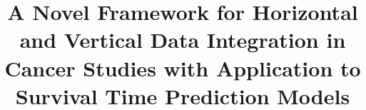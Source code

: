 \documentclass{bmcart}
\begin{document}
\begin{frontmatter}

\begin{fmbox}


\title{A Novel Framework for Horizontal and Vertical Data Integration in Cancer
Studies with Application to Survival Time Prediction Models}



\author[
   addressref={fmi},                   %
   email={iliqn.mihailov.92@gmail.com}   %
]{ }
\author[
   addressref={boku,iml},                   %
   email={maciek.kandula@gmail.com}   %
]{ }
\author[
   addressref={fmi},                   %
   email={milkok@fmi.uni-sofia.bg}   %
]{ }
\author[
   addressref={fmi},                   %
   corref={fmi},                       %
   email={dimitar.vassilev@fmi.uni-sofia.bg}   %
]{ }




\end{fmbox}
\end{frontmatter}
\end{document}
